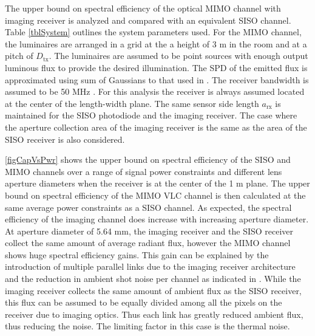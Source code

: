 The upper bound on spectral efficiency of the optical MIMO channel with imaging receiver is analyzed and compared with an equivalent SISO channel. Table \ref{tblSystem} outlines the system parameters used. For the MIMO channel, the luminaires are arranged in a grid at the a height of 3 m in the room and at a pitch of $D_{\text{tx}}$. The luminaires are assumed to be point sources with enough output luminous flux to provide the desired illumination. The SPD of the emitted flux is approximated using sum of Gaussians to that used in \cite{gru08b}. The receiver bandwidth is assumed to be 50 MHz \cite{zen08a}. For this analysis the receiver is always assumed located at the center of the length-width plane. The same sensor side length $a_{\text{rx}}$ is maintained for the SISO photodiode and the imaging receiver. The case where the aperture collection area of the imaging receiver is the same as the area of the SISO receiver is also considered. 


\figurename{ \ref{figCapVsPwr}} shows the upper bound on spectral efficiency of the SISO and MIMO channels over a range of signal power constraints and different lens aperture diameters when the receiver is at the center of the 1 m plane. The upper bound on spectral efficiency of the MIMO VLC channel is then calculated at the same average power constraints as a SISO channel. As expected, the spectral efficiency of the imaging channel does increase with increasing aperture diameter. At aperture diameter of 5.64 mm, the imaging receiver and the SISO receiver collect the same amount of average radiant flux, however the MIMO channel shows huge spectral efficiency gains. This gain can be explained by the introduction of multiple parallel links due to the imaging receiver architecture and the reduction in ambient shot noise per channel as indicated in \cite{dja00a}. While the imaging receiver collects the same amount of ambient flux as the SISO receiver, this flux can be assumed to be equally divided among all the pixels on the receiver due to imaging optics. Thus each link has greatly reduced ambient flux, thus reducing the noise. The limiting factor in this case is the thermal noise.


